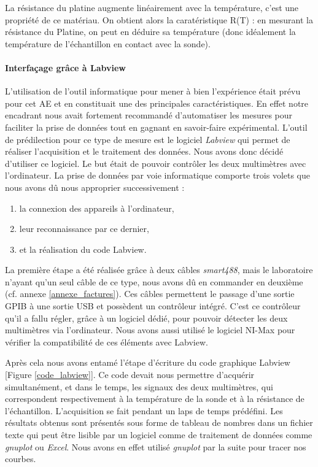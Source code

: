 La résistance du platine augmente linéairement avec la température, c'est une propriété de ce matériau.
On obtient alors la caratéristique R(T) : en mesurant la résistance du Platine, on peut en déduire sa température 
(donc idéalement la température de l'échantillon en contact avec la sonde).


\paragraph{Interfaçage grâce à Labview}
L'utilisation de l'outil informatique pour mener à bien l'expérience était prévu pour cet AE et en constituait une des principales caractéristiques. En effet notre encadrant nous avait fortement recommandé d'automatiser les mesures pour faciliter la prise de données tout en gagnant en savoir-faire expérimental. L'outil de prédilection pour ce type de mesure est le logiciel \emph{Labview} qui permet de réaliser l'acquisition et le traitement des données. Nous avons donc décidé d'utiliser ce logiciel. Le but était de pouvoir contrôler les deux multimètres avec l'ordinateur. La prise de données par voie informatique comporte trois volets que nous avons dû nous approprier successivement : 

\begin{enumerate}
\item la connexion des appareils à l'ordinateur, 
\item leur reconnaissance par ce dernier, 
\item et la réalisation du code Labview. 
\end{enumerate}

La première étape a été réalisée grâce à deux câbles \emph{smart488}, mais le laboratoire n'ayant qu'un seul câble 
de ce type, nous avons dû en commander en deuxième (cf. annexe \ref{annexe_factures}).
Ces câbles permettent le passage d'une sortie GPIB à une sortie USB et possèdent un contrôleur intégré. 
C'est ce contrôleur qu'il a fallu régler, grâce à un logiciel dédié, pour pouvoir détecter les deux multimètres 
via l'ordinateur. Nous avons aussi utilisé le logiciel NI-Max pour vérifier la compatibilité de ces éléments avec Labview. 

Après cela nous avons entamé l'étape d'écriture du code graphique Labview [Figure \ref{code_labview}]. Ce code devait nous permettre d'acquérir 
simultanément, et dans le temps, les signaux des deux multimètres, qui correspondent 
respectivement à la température de la sonde 
et à la résistance de l'échantillon. L'acquisition se fait pendant un laps de temps prédéfini. 
Les résultats obtenus sont présentés sous forme de tableau de nombres dans un fichier texte qui peut être 
lisible par un logiciel comme de traitement de données comme \textit{gnuplot} ou \textit{Excel}.
Nous avons en effet utilisé \textit{gnuplot} par la suite pour tracer nos courbes.

